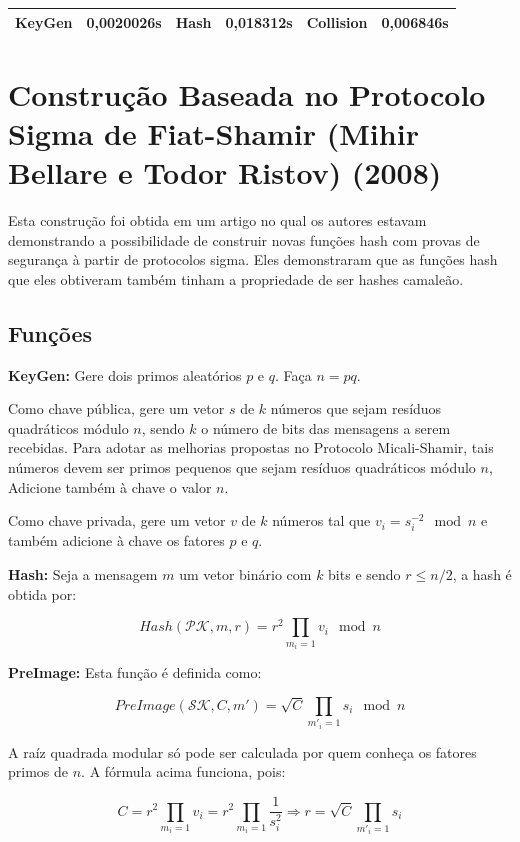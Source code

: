 \documentclass[a4paper]{article}
\begin{document}
 \begin{center}
 \begin{tabular}{|c|c|c|c|c|c|}
 \hline
 KeyGen & 0,0020026s & Hash & 0,018312s & Collision & 0,006846s\\
 \hline
 \end{tabular}
 \end{center}
 
 
 \section{Construção Baseada no Protocolo Sigma de Fiat-Shamir
 (Mihir Bellare e Todor Ristov) (2008)\cite{sigma}}
 
 Esta construção foi obtida em um artigo no qual os autores estavam
 demonstrando a possibilidade de construir novas funções hash com
 provas de segurança à partir de protocolos sigma. Eles demonstraram
 que as funções hash que eles obtiveram também tinham a propriedade de
 ser hashes camaleão.
 
 \subsection{Funções}
 
 \textbf{KeyGen: } Gere dois primos aleatórios $p$ e $q$. Faça $n=pq$.
 
 Como chave pública, gere um vetor $s$ de $k$ números que sejam
 resíduos quadráticos módulo $n$, sendo $k$ o número de bits das
 mensagens a serem recebidas. Para adotar as melhorias propostas no
 Protocolo Micali-Shamir, tais números devem ser primos pequenos que
 sejam resíduos quadráticos módulo $n$, Adicione também à chave o valor
 $n$.
 
 Como chave privada, gere um vetor $v$ de $k$ números tal que
 $v_i=s_i^{-2} \mod n$ e também adicione à chave os fatores $p$ e $q$.
 
 \textbf{Hash: } Seja a mensagem $m$ um vetor binário com $k$ bits e
 sendo $r \leq n/2$, a hash é obtida por:
 
 $$ Hash(\mathcal{PK}, m, r) = r^2\prod_{m_i=1}v_i \mod n
 $$
 
 \textbf{PreImage: } Esta função é definida como:
 
 $$
 PreImage(\mathcal{SK}, C, m') = \sqrt{C}\prod_{m'_i=1}s_i \mod n
 $$
 
 A raíz quadrada modular só pode ser calculada por quem conheça os
 fatores primos de $n$. A fórmula acima funciona, pois:
 
 $$ C = r^2\prod_{m_i=1}v_i =
 r^2\prod_{m_i=1}\frac{1}{s_i^2}\Longrightarrow r=\sqrt{C}\prod_{m'_i=1}s_i
 $$
 
\end{document}
